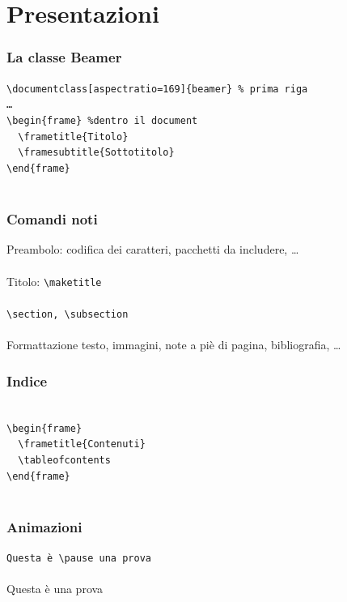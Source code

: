 \section{Presentazioni}
\begin{frame}\centering
  \frametitle{La classe Beamer}
  \texttt{\textbackslash{}documentclass[aspectratio=169]\{beamer\} \% prima riga}
  \pause
  \texttt{\\\dots\\
  \textbackslash{}begin\{frame\} \%dentro il document
\\
  ~~\textbackslash{}frametitle\{Titolo\}~~~~~~~~~~~~~
\\
  ~~\textbackslash{}framesubtitle\{Sottotitolo\}~~~~~
\\
  \textbackslash{}end\{frame\}
~~~~~~~~~~~~~~~~~~~~~~~\\~}
\end{frame}
\begin{frame}\centering
  \frametitle{Comandi noti}
  Preambolo: codifica dei caratteri, pacchetti da includere, \dots\\~\\\pause
  Titolo: \texttt{\textbackslash{}maketitle}\\~\\\pause
  \texttt{\textbackslash{}section, \textbackslash{}subsection}\\~\\\pause
  Formattazione testo, immagini, note a piè di pagina, bibliografia, \dots
\end{frame}
\begin{frame}\centering
  \frametitle{Indice}
  \texttt{~\\
  \textbackslash{}begin\{frame\}~~~~~~~~~~~\\
  ~~\textbackslash{}frametitle\{Contenuti\}\\
  ~~\textbackslash{}tableofcontents~~~~~~~~\\
  \textbackslash{}end\{frame\}~~~~~~~~~~~~~\\~
}
\end{frame}
\begin{frame}\centering
  \frametitle{Animazioni}
  \texttt{Questa è \textbackslash{}pause una prova}\\~\\\pause
  Questa è \pause una prova
\end{frame}
